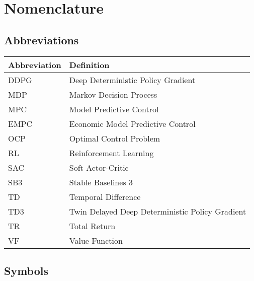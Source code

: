 \chapter*{Nomenclature}
\section*{Abbreviations}

\begin{longtable}{p{2.5cm}p{8cm}}
    \toprule
    Abbreviation & Definition \\
    \midrule\endhead %
    DDPG& Deep Deterministic Policy Gradient\\
    MDP& Markov Decision Process\\
    MPC& Model Predictive Control\\
    EMPC& Economic Model Predictive Control\\
    OCP& Optimal Control Problem\\
    RL& Reinforcement Learning\\
    SAC& Soft Actor-Critic\\
    SB3& Stable Baselines 3\\
    TD& Temporal Difference\\
    TD3& Twin Delayed Deep Deterministic Policy Gradient\\
    TR& Total Return\\
    VF& Value Function\\
    \bottomrule
\end{longtable}




\section*{Symbols}

